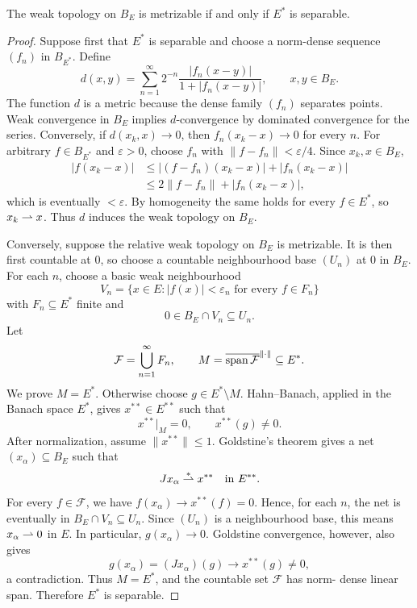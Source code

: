 \begin{notetheorem}
The weak topology on $B_E$ is metrizable if and only if $E^*$ is separable.
\end{notetheorem}

\begin{proof}
Suppose first that $E^*$ is separable and choose a norm-dense sequence
$(f_n)$ in $B_{E^*}$.  Define
\[
  d(x,y)=\sum_{n=1}^{\infty}2^{-n}
         \frac{|f_n(x-y)|}{1+|f_n(x-y)|},
  \qquad x,y\in B_E.
\]
The function $d$ is a metric because the dense family $(f_n)$ separates
points.  Weak convergence in $B_E$ implies $d$-convergence by dominated
convergence for the series.  Conversely, if $d(x_k,x)\to0$, then
$f_n(x_k-x)\to0$ for every $n$.  For arbitrary $f\in B_{E^*}$ and
$\varepsilon>0$, choose $f_n$ with $\|f-f_n\|<\varepsilon/4$.  Since
$x_k,x\in B_E$,
\[
\begin{aligned}
  |f(x_k-x)|
   &\le |(f-f_n)(x_k-x)|+|f_n(x_k-x)|\\
   &\le2\|f-f_n\|+|f_n(x_k-x)|,
\end{aligned}
\]
which is eventually $<\varepsilon$.  By homogeneity the same holds for every
$f\in E^*$, so $x_k\rightharpoonup x$.  Thus $d$ induces the weak topology on
$B_E$.

Conversely, suppose the relative weak topology on $B_E$ is metrizable.  It
is then first countable at $0$, so choose a countable neighbourhood base
$(U_n)$ at $0$ in $B_E$.  For each $n$, choose a basic weak neighbourhood
\[
  V_n=\{x\in E:|f(x)|<\varepsilon_n
                 \text{ for every }f\in F_n\}
\]
with $F_n\subseteq E^*$ finite and
\[
  0\in B_E\cap V_n\subseteq U_n.
\]
Let
\[
  \mathcal F=\bigcup_{n=1}^{\infty}F_n,
  \qquad
  M=\overline{\operatorname{span}\mathcal F}^{\|\cdot\|}\subseteq E^*.
\]
We prove $M=E^*$.  Otherwise choose $g\in E^*\setminus M$.  Hahn--Banach,
applied in the Banach space $E^*$, gives $x^{**}\in E^{**}$ such that
\[
  x^{**}|_M=0,
  \qquad
  x^{**}(g)\ne0.
\]
After normalization, assume $\|x^{**}\|\le1$.  Goldstine's theorem gives a
net $(x_\alpha)\subseteq B_E$ such that
\[
  Jx_\alpha\overset{*}{\rightharpoonup} x^{**}
  \quad\text{in }E^{**}.
\]
For every $f\in\mathcal F$, we have
$f(x_\alpha)\to x^{**}(f)=0$.  Hence, for each $n$, the net is eventually in
$B_E\cap V_n\subseteq U_n$.  Since $(U_n)$ is a neighbourhood base, this
means $x_\alpha\rightharpoonup0$ in $E$.  In particular, $g(x_\alpha)\to0$.
Goldstine convergence, however, also gives
\[
  g(x_\alpha)=(Jx_\alpha)(g)\longrightarrow x^{**}(g)\ne0,
\]
a contradiction.  Thus $M=E^*$, and the countable set $\mathcal F$ has norm-
dense linear span.  Therefore $E^*$ is separable.
\end{proof}

